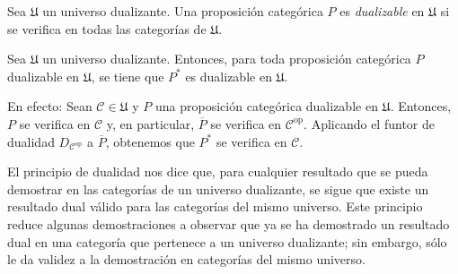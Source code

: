 \documentclass[tesis]{subfiles}
\begin{document}
%

\begin{Def}
    Sea $\mathfrak{U}$ un universo dualizante. Una proposición categórica $P$ es \emph{dualizable} en $\mathfrak{U}$ si se verifica en todas las categorías de $\mathfrak{U}$.
\end{Def}

\begin{Obs}
    Sea $\mathfrak{U}$ un universo dualizante. Entonces, para toda proposición categórica $P$ dualizable en $\mathfrak{U}$, se tiene que $P^\ast$ es dualizable en $\mathfrak{U}$.
    \vspace{1mm}

    En efecto: Sean $\mathscr{C}\in \mathfrak{U}$ y $P$ una proposición categórica dualizable en $\mathfrak{U}$. Entonces, $P$ se verifica en $\mathscr{C}$ y, en particular, $\overline{P}$ se verifica en $\mathscr{C}^\text{op}$. Aplicando el funtor de dualidad $D_{\mathscr{C}^\text{op}}$ a $\overline{P}$, obtenemos que $P^\ast$ se verifica en $\mathscr{C}$.
\end{Obs}

El principio de dualidad nos dice que, para cualquier resultado que se pueda demostrar en las categorías de un universo dualizante, se sigue que existe un resultado dual válido para las categorías del mismo universo. Este principio reduce algunas demostraciones a observar que ya se ha demostrado un resultado dual en una categoría que pertenece a un universo dualizante; sin embargo, sólo le da validez a la demostración en categorías del mismo universo. \\
\end{document}

